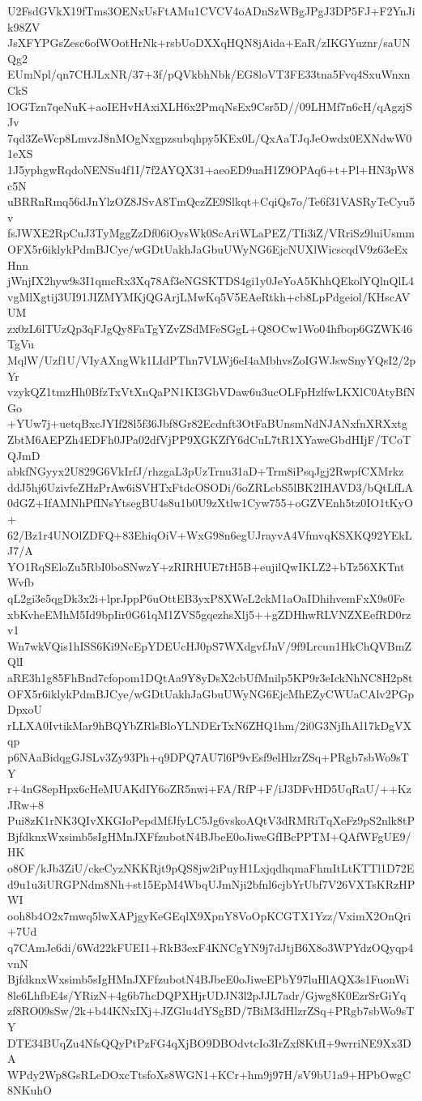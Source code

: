U2FsdGVkX19fTms3OENxUsFtAMu1CVCV4oADnSzWBgJPgJ3DP5FJ+F2YnJik98ZV
JsXFYPGsZesc6ofWOotHrNk+rsbUoDXXqHQN8jAida+EaR/zIKGYuznr/saUNQg2
EUmNpl/qn7CHJLxNR/37+3f/pQVkbhNbk/EG8loVT3FE33tna5Fvq4SxuWnxnCkS
lOGTzn7qeNuK+aoIEHvHAxiXLH6x2PmqNsEx9Csr5D//09LHMf7n6cH/qAgzjSJv
7qd3ZeWcp8LmvzJ8nMOgNxgpzsubqhpy5KEx0L/QxAaTJqJeOwdx0EXNdwW01eXS
1J5yphgwRqdoNENSu4f1I/7f2AYQX31+aeoED9uaH1Z9OPAq6+t+Pl+HN3pW8c5N
uBRRnRmq56dJnYlzOZ8JSvA8TmQczZE9Slkqt+CqiQs7o/Te6f31VASRyTeCyu5v
fsJWXE2RpCuJ3TyMggZzDf06iOysWk0ScAriWLaPEZ/TIi3iZ/VRriSz9luiUsmm
OFX5r6iklykPdmBJCye/wGDtUakhJaGbuUWyNG6EjcNUXlWicscqdV9z63eExHnn
jWnjIX2hyw9s3I1qmcRx3Xq78Af3eNGSKTDS4gi1y0JeYoA5KhhQEkolYQlnQlL4
vgMlXgtij3UI91JIZMYMKjQGArjLMwKq5V5EAeRtkh+cb8LpPdgeiol/KHscAVUM
zx0zL6lTUzQp3qFJgQy8FaTgYZvZSdMFeSGgL+Q8OCw1Wo04hfbop6GZWK46TgVu
MqlW/Uzf1U/VIyAXngWk1LIdPThn7VLWj6eI4aMbhvsZoIGWJswSnyYQsI2/2pYr
vzykQZ1tmzHh0BfzTxVtXnQaPN1KI3GbVDaw6u3ucOLFpHzlfwLKXlC0AtyBfNGo
+YUw7j+uetqBxcJYIf28l5f36Jbf8Gr82Ecdnft3OtFaBUnsmNdNJANxfnXRXxtg
ZbtM6AEPZh4EDFh0JPa02dfVjPP9XGKZfY6dCuL7tR1XYaweGbdHIjF/TCoTQJmD
abkfNGyyx2U829G6VkIrfJ/rhzgaL3pUzTrnu31aD+Trm8iPsqJgj2RwpfCXMrkz
ddJ5hj6UzivfeZHzPrAw6iSVHTxFtdcOSODi/6oZRLcbS5lBK2IHAVD3/bQtLfLA
0dGZ+IfAMNhPfINsYtsegBU4s8u1b0U9zXtlw1Cyw755+oGZVEnh5tz0IO1tKyO+
62/Bz1r4UNOlZDFQ+83EhiqOiV+WxG98n6egUJrayvA4VfmvqKSXKQ92YEkLJ7/A
YO1RqSEloZu5RbI0boSNwzY+zRIRHUE7tH5B+eujilQwIKLZ2+bTz56XKTntWvfb
qL2gi3e5qgDk3x2i+lprJppP6uOttEB3yxP8XWeL2ckM1aOaIDhihvemFxX9s0Fe
xbKvheEMhM5Id9bpIir0G61qM1ZVS5gqezhsXlj5++gZDHhwRLVNZXEefRD0rzv1
Wn7wkVQis1hISS6Ki9NcEpYDEUcHJ0pS7WXdgvfJnV/9f9Lrcun1HkChQVBmZQlI
aRE3h1g85FhBnd7cfopom1DQtAa9Y8yDsX2cbUfMnilp5KP9r3eIckNhNC8H2p8t
OFX5r6iklykPdmBJCye/wGDtUakhJaGbuUWyNG6EjcMhEZyCWUaCAlv2PGpDpxoU
rLLXA0IvtikMar9hBQYbZRlsBloYLNDErTxN6ZHQ1hm/2i0G3NjIhAl17kDgVXqp
p6NAaBidqgGJSLv3Zy93Ph+q9DPQ7AU7l6P9vEsf9elHlzrZSq+PRgb7sbWo9sTY
r+4nG8epHpx6cHeMUAKdIY6oZR5nwi+FA/RfP+F/iJ3DFvHD5UqRaU/++KzJRw+8
Pui8zK1rNK3QIvXKGIoPepdMfJfyLC5Jg6vskoAQtV3dRMRiTqXeFz9pS2nlk8tP
BjfdknxWxsimb5sIgHMnJXFfzubotN4BJbeE0oJiweGfIBcPPTM+QAfWFgUE9/HK
o8OF/kJb3ZiU/ckeCyzNKKRjt9pQS8jw2iPuyH1LxjqdhqmaFhmItLtKTTl1D72E
d9u1u3iURGPNdm8Nh+st15EpM4WbqUJmNji2bfnl6cjbYrUbf7V26VXTsKRzHPWI
ooh8b4O2x7mwq5lwXAPjgyKeGEqlX9XpnY8VoOpKCGTX1Yzz/VximX2OnQri+7Ud
q7CAmJe6di/6Wd22kFUEI1+RkB3exF4KNCgYN9j7dJtjB6X8o3WPYdzOQyqp4vnN
BjfdknxWxsimb5sIgHMnJXFfzubotN4BJbeE0oJiweEPbY97luHlAQX3s1FuonWi
8le6LhfbE4s/YRizN+4g6b7hcDQPXHjrUDJN3l2pJJL7adr/Gjwg8K0EzrSrGiYq
zf8RO09sSw/2k+b44KNxIXj+JZGlu4dYSgBD/7BiM3dHlzrZSq+PRgb7sbWo9sTY
DTE34BUqZu4NfsQQyPtPzFG4qXjBO9DBOdvtcIo3IrZxf8KtfI+9wrriNE9Xx3DA
WPdy2Wp8GsRLeDOxcTtsfoXs8WGN1+KCr+hm9j97H/sV9bU1a9+HPbOwgC8NKuhO
